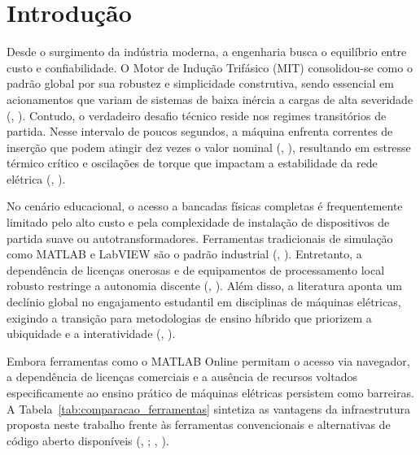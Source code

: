\documentclass[a4paper]{ifacconf}
\begin{document}

\section{Introdução}

Desde o surgimento da indústria moderna, a engenharia busca o equilíbrio entre custo e confiabilidade. O Motor de Indução Trifásico (MIT) consolidou-se como o padrão global por sua robustez e simplicidade construtiva, sendo essencial em acionamentos que variam de sistemas de baixa inércia a cargas de alta severidade (\citeauthor{Umans2014EN}, \citeyear{Umans2014EN}). Contudo, o verdadeiro desafio técnico reside nos regimes transitórios de partida. Nesse intervalo de poucos segundos, a máquina enfrenta correntes de inserção que podem atingir dez vezes o valor nominal (\citeauthor{jain2014modeling}, \citeyear{jain2014modeling}), resultando em estresse térmico crítico e oscilações de torque que impactam a estabilidade da rede elétrica (\citeauthor{ikeda2007simulation}, \citeyear{ikeda2007simulation}).

No cenário educacional, o acesso a bancadas físicas completas é frequentemente limitado pelo alto custo e pela complexidade de instalação de dispositivos de partida suave ou autotransformadores. Ferramentas tradicionais de simulação como MATLAB e LabVIEW são o padrão industrial (\citeauthor{aktaibi2011dynamic}, \citeyear{aktaibi2011dynamic}). Entretanto, a dependência de licenças onerosas e de equipamentos de processamento local robusto restringe a autonomia discente (\citeauthor{leedy2013simulink}, \citeyear{leedy2013simulink}). Além disso, a literatura aponta um declínio global no engajamento estudantil em disciplinas de máquinas elétricas, exigindo a transição para metodologias de ensino híbrido que priorizem a ubiquidade e a interatividade (\citeauthor{singh2019improving}, \citeyear{singh2019improving}).

Embora ferramentas como o MATLAB Online permitam o acesso via navegador, a dependência de licenças comerciais e a ausência de recursos voltados especificamente ao ensino prático de máquinas elétricas persistem como barreiras. A Tabela~\ref{tab:comparacao_ferramentas} sintetiza as vantagens da infraestrutura proposta neste trabalho frente às ferramentas convencionais e alternativas de código aberto disponíveis (\citeauthor{li2010simulation}, \citeyear{li2010simulation}; \citeauthor{leedy2013simulink}, \citeyear{leedy2013simulink}).
\end{document}
